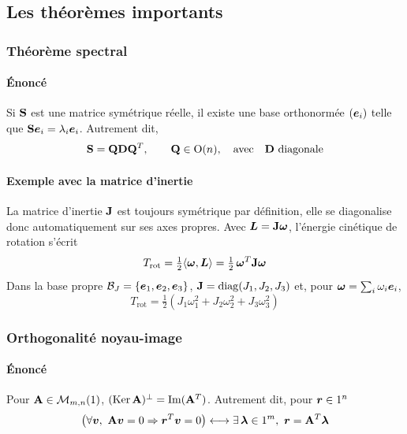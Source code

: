 \subsection{Les théorèmes importants}

\subsubsection{Théorème spectral}

\paragraph{Énoncé}

\begin{theoreme}
    Si $\mathbf{S}$ est une matrice symétrique réelle, il existe une base
    orthonormée $(\bm{e}_i)$ telle que
    $\mathbf{S}\bm{e}_i = \lambda_i\bm{e}_i$. Autrement dit,
    \[
        \mathbf{S} = \mathbf{Q}\mathbf{D}\mathbf{Q}^T,
        \qquad \mathbf{Q}\in\mathrm{O}(n),
        \quad \text{avec} \quad \mathbf{D} \text{ diagonale}
    \]
\end{theoreme}

\paragraph{Exemple avec la matrice d'inertie}

La matrice d'inertie $\mathbf{J}$ est toujours symétrique par définition, elle se diagonalise donc
automatiquement sur ses axes propres.
Avec $\bm{L} = \mathbf{J}\bm{\omega}$, l'énergie cinétique de
rotation s'écrit
\[
    T_{\mathrm{rot}}
    = \tfrac12\langle\bm{\omega},\bm{L}\rangle
    = \tfrac12\,\bm{\omega}^T\mathbf{J}\bm{\omega}
\]
Dans la base propre $\mathcal{B}_J = \{\bm{e}_1,\bm{e}_2,\bm{e}_3\}$,
$\mathbf{J} = \mathrm{diag}(J_1,J_2,J_3)$ et, pour
$\bm{\omega} = \sum_i \omega_i\bm{e}_i$,
\[
    T_{\mathrm{rot}}
    = \tfrac12\left(J_1\omega_1^2 + J_2\omega_2^2 + J_3\omega_3^2\right)
\]

\subsubsection{Orthogonalité noyau-image}

\paragraph{Énoncé}

\begin{theoreme}
    Pour $\mathbf{A}\in\mathcal{M}_{m,n}(1)$,
    $(\operatorname{Ker}\mathbf{A})^\perp = \operatorname{Im}(\mathbf{A}^T)$. Autrement dit, pour $\bm{r} \in 1^n$
    \[
        \bigl(\forall\bm{v},\ \mathbf{A}\bm{v} = 0
        \Rightarrow \bm{r}^T\bm{v} = 0\bigr)
        \longleftrightarrow
        \exists\,\bm{\lambda}\in1^m,\
        \bm{r} = \mathbf{A}^T\bm{\lambda}
    \]
\end{theoreme}

